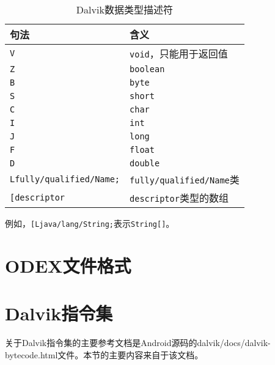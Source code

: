 \begin{table}[htbp]
  \caption{Dalvik数据类型描述符}
  \label{Fig:dalvik_type}
  \centering
  \begin{tabular}{ll}
    \toprule
    \textbf{句法} & \textbf{含义} \\
    \midrule
    \lstinline!V! & \lstinline!void!，只能用于返回值 \\
    \lstinline!Z! & \lstinline!boolean! \\
    \lstinline!B! & \lstinline!byte! \\
    \lstinline!S! & \lstinline!short! \\
    \lstinline!C! & \lstinline!char! \\
    \lstinline!I! & \lstinline!int! \\
    \lstinline!J! & \lstinline!long! \\
    \lstinline!F! & \lstinline!float! \\
    \lstinline!D! & \lstinline!double! \\
    \lstinline!Lfully/qualified/Name;! & \lstinline!fully/qualified/Name!类 \\
    \lstinline![descriptor! & \lstinline!descriptor!类型的数组 \\
    \bottomrule
  \end{tabular}
\end{table}

例如，\lstinline![Ljava/lang/String;!表示\lstinline!String[]!。

\section{ODEX文件格式}
\label{Sec:odex}

\section{Dalvik指令集}
关于Dalvik指令集的主要参考文档是Android源码的dalvik/docs/dalvik-bytecode.html文件。本节的主要内容来自于该文档。

